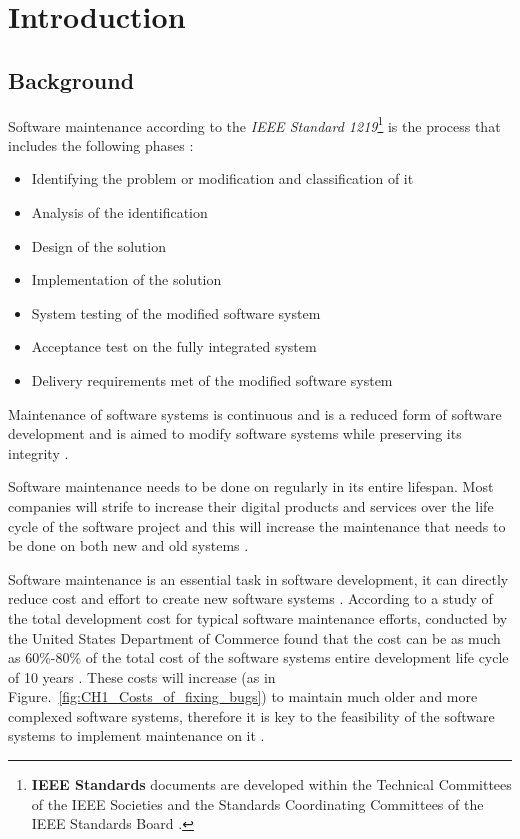\chapter{Introduction}
\label{chap:1}

\section{Background}\label{section:background}

Software maintenance according to the \textit{IEEE Standard 1219}\footnote{\textbf{IEEE Standards} documents are developed within the Technical Committees of the IEEE Societies and the Standards Coordinating Committees of the IEEE Standards Board \cite{Mamone1994}.} is the process that includes the following phases \cite{Mamone1994, Hasan2012}:
\begin{itemize}
	\item Identifying the problem or modification and classification of it
	\item Analysis of the identification
	\item Design of the solution
	\item Implementation of the solution
	\item System testing of the modified software system
	\item Acceptance test on the fully integrated system
	\item Delivery requirements met of the modified software system
\end{itemize}

Maintenance of software systems is continuous and is a reduced form of software development and is aimed to modify software systems while preserving its integrity \cite{Sneed2004, Ackermann2009}.\par Software maintenance needs to be done on regularly in its entire lifespan. Most companies will strife to increase their digital products and services over the life cycle of the software project and this will increase the maintenance that needs to be done on both new and old systems \cite{Niu2018, Galster2019, Hasan2012}. \par Software maintenance is an essential task in software development, it can directly reduce cost and effort to create new software systems \cite{FrancisThamburaj2017}. According to a study of the total development cost for typical software maintenance efforts, conducted by the United States Department of Commerce found that the cost can be as much as $60\%$-$80\%$ of the total cost of the software systems entire development life cycle of 10 years \cite{Ogheneovo2014, Stark1996, Ackermann2009}. These costs will increase (as in Figure.~\ref{fig:CH1_Costs_of_fixing_bugs}) to maintain much older and more complexed software systems, therefore it is key to the feasibility of the software systems to implement maintenance on it \cite{Alenezi2016, Booch1986}.

